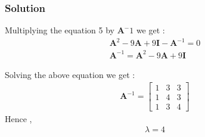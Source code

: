 \documentclass{beamer}
\begin{document}
\begin{frame}
\frametitle{Solution}
Multiplying the equation 5 by $\textbf{A}^-1$ we get :
\begin{align}
  \textbf{A}^2 -9\textbf{A} +9\textbf{I} - \textbf{A}^{-1} = 0 \\
  \textbf{A}^{-1} = \textbf{A}^2 -9\textbf{A} +9\textbf{I}
\end{align}

Solving the above equation we get :
\begin{align}
   \textbf{A}^{-1} = \begin{bmatrix}1&3&3\\1&4&3\\1&3&4\end{bmatrix}
\end{align}
Hence ,
\begin{align}
    \lambda = 4
\end{align}
\end{frame}
\end{document}
